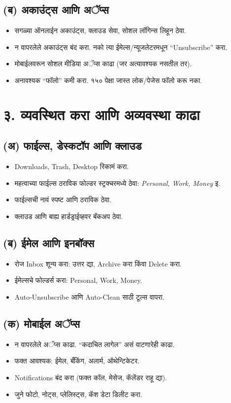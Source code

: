 \subsection*{(ब) अकाउंट्स आणि अॅप्स}
\begin{itemize}
  \item सगळ्या ऑनलाईन अकाउंट्स, क्लाउड सेवा, सोशल लॉगिन्स लिहून ठेवा.  
  \item न वापरलेले अकाउंट्स बंद करा. नको त्या ईमेल्स/न्यूजलेटरमधून “Unsubscribe” करा.  
  \item मोबाईलवरून सोशल मीडिया अॅप्स काढा (जर अत्यावश्यक नसतील तर).  
  \item अनावश्यक “फॉलो” कमी करा. १५० पेक्षा जास्त लोक/पेजेस फॉलो करू नका.  
\end{itemize}

\section*{३. व्यवस्थित करा आणि अव्यवस्था काढा}

\subsection*{(अ) फाईल्स, डेस्कटॉप आणि क्लाउड}
\begin{itemize}
  \item Downloads, Trash, Desktop रिकामं करा.  
  \item महत्वाच्या फाईल्स ठराविक फोल्डर स्ट्रक्चरमध्ये ठेवा: \textit{Personal, Work, Money} इ.  
  \item फाईल्सची नावं स्पष्ट आणि ठराविक ठेवा.  
  \item क्लाउड आणि बाह्य हार्डड्राईव्हवर बॅकअप ठेवा.  
\end{itemize}

\subsection*{(ब) ईमेल आणि इनबॉक्स}
\begin{itemize}
  \item रोज Inbox शून्य करा: उत्तर द्या, Archive करा किंवा Delete करा.  
  \item ईमेल्सचे फोल्डर्स करा: Personal, Work, Money.  
  \item Auto-Unsubscribe आणि Auto-Clean साठी टूल्स वापरा.  
\end{itemize}

\subsection*{(क) मोबाईल अॅप्स}
\begin{itemize}
  \item न वापरलेले अॅप्स काढा. “कदाचित लागेल” असं वाटणारेही काढा.  
  \item फक्त आवश्यक: ईमेल, बँकिंग, अलार्म, ऑथेन्टिकेटर.  
  \item Notifications बंद करा (फक्त कॉल, मेसेज, कॅलेंडर राहू द्या).  
  \item जुने फोटो, नोट्स, प्लेलिस्ट्स, कॅश डेटा डिलीट करा.  
\end{itemize}

